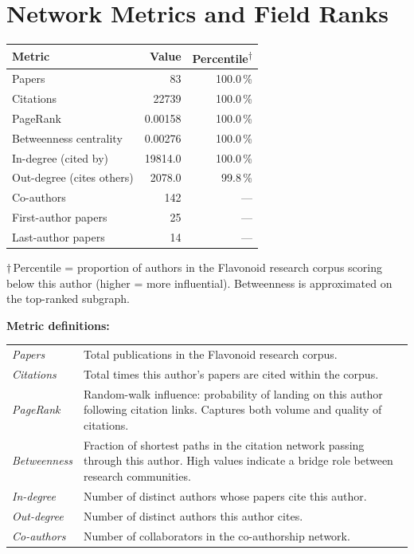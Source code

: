\documentclass[a4paper,11pt]{article}
\begin{document}
\section*{Network Metrics and Field Ranks}

\begin{tabular}{p{6.5cm}rr}
\toprule
Metric & Value & Percentile\textsuperscript{$\dagger$} \\
\midrule
    Papers & 83 & 100.0\,\% \\
    Citations & 22739 & 100.0\,\% \\
    PageRank & 0.00158 & 100.0\,\% \\
    Betweenness centrality & 0.00276 & 100.0\,\% \\
    In-degree (cited by) & 19814.0 & 100.0\,\% \\
    Out-degree (cites others) & 2078.0 & 99.8\,\% \\
    Co-authors & 142 & --- \\
    First-author papers & 25 & --- \\
    Last-author papers & 14 & --- \\
\bottomrule
\end{tabular}

\smallskip
{\footnotesize
$\dagger$\,Percentile = proportion of authors in the Flavonoid research corpus scoring below this author (higher = more influential).
Betweenness is approximated on the top-ranked subgraph.
\smallskip

\textbf{Metric definitions:}
\begin{tabular}{p{3.5cm}p{10.5cm}}
\textit{Papers} & Total publications in the Flavonoid research corpus. \\
\textit{Citations} & Total times this author's papers are cited within the corpus. \\
\textit{PageRank} & Random-walk influence: probability of landing on this author following citation links. Captures both volume and quality of citations. \\
\textit{Betweenness} & Fraction of shortest paths in the citation network passing through this author. High values indicate a bridge role between research communities. \\
\textit{In-degree} & Number of distinct authors whose papers cite this author. \\
\textit{Out-degree} & Number of distinct authors this author cites. \\
\textit{Co-authors} & Number of collaborators in the co-authorship network. \\
\end{tabular}
}
\end{document}
